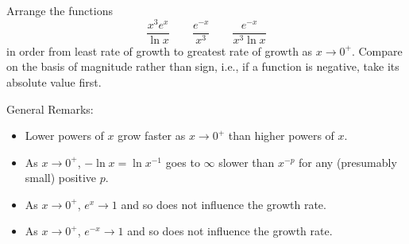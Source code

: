 \documentclass{ximera}
\begin{document}
\begin{question}%

Arrange the functions 
\[ \frac{x^{3} e^{x}}{\ln{x}} \qquad \frac{e^{- x}}{x^{3}} \qquad \frac{e^{- x}}{x^{3} \ln{x}} \]
in order from least rate of growth to greatest rate of growth as \(x \rightarrow 0^+\). Compare on the basis of magnitude rather than sign, i.e., if a function is negative, take its absolute value first.
\begin{multiplechoice}
\end{multiplechoice}
\begin{feedback}
General Remarks:
\begin{itemize} \item Lower powers of \(x\) grow faster as \(x \rightarrow 0^+\) than higher powers of \(x\).
\item As \(x \rightarrow 0^+\), \(-\ln x = \ln x^{-1}\) goes to \(\infty\) slower than \(x^{-p}\) for any (presumably small) positive \(p\).
\item As \(x \rightarrow 0^+\), \(e^{x} \rightarrow 1\) and so does not influence the growth rate.
\item As \(x \rightarrow 0^+\), \(e^{-x} \rightarrow 1\) and so does not influence the growth rate.
\end{itemize}
\end{feedback}

\end{question}
\end{document}
